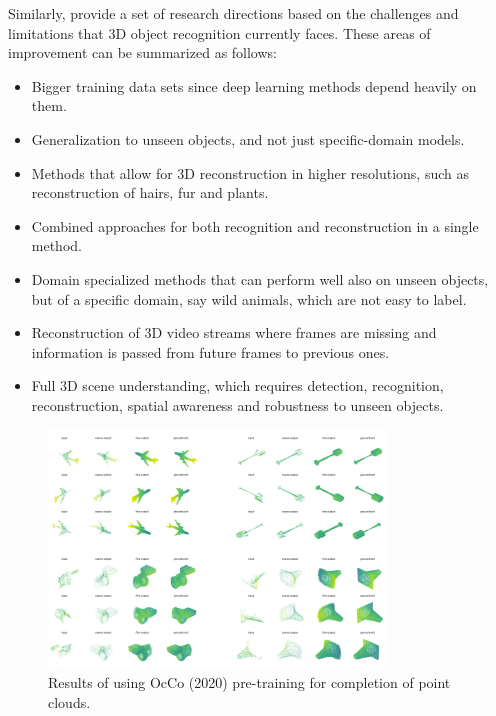 Similarly, \citeauthor{han2019image} provide a set of research directions based on the challenges and limitations that 3D object recognition currently faces. These areas of improvement can be summarized as follows:
\begin{itemize}
    \item Bigger training data sets since deep learning methods depend heavily on them. 
    \item Generalization to unseen objects, and not just specific-domain models.
    \item Methods that allow for 3D reconstruction in higher resolutions, such as reconstruction of hairs, fur and plants.
    \item Combined approaches for both recognition and reconstruction in a single method.
    \item Domain specialized methods that can perform well also on unseen objects, but of a specific domain, say wild animals, which are not easy to label.
    \item Reconstruction of 3D video streams where frames are missing and information is passed from future frames to previous ones.
    \item Full 3D scene understanding, which requires detection, recognition, reconstruction, spatial awareness and robustness to unseen objects.
\end{itemize}
\begin{figure}[!ht]
        \centering
        \includegraphics[width=0.8\textwidth]{images/occo-results}
        \caption{Results of using OcCo (2020) pre-training for completion of point clouds.}
        \label{fig:occo-results}
    \end{figure}
    



